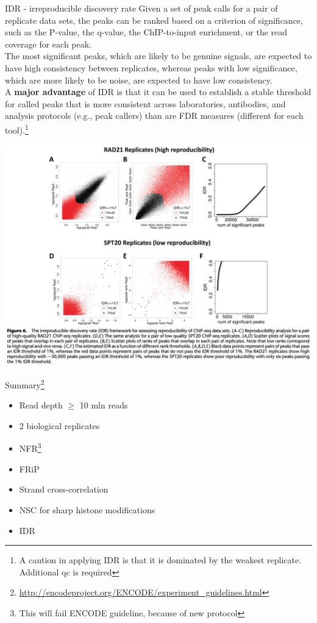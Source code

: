 \documentclass{beamer}
\begin{document}
\begin{frame}{IDR - irreproducible discovery rate}
Given a set of peak calls for a pair of replicate data sets, the peaks can be ranked based on a criterion of significance, such as the P-value, the q-value, the ChIP-to-input enrichment, or the read coverage for each peak.\\
The most significant peaks, which are likely to be genuine signals, are expected to have high consistency between replicates, whereas peaks with low significance, which are more likely to be noise, are expected to have low consistency.\\
A \textbf{major advantage} of IDR is that it can be used to establish a stable threshold for called peaks that is more consistent across laboratories, antibodies, and analysis protocols (e.g., peak callers) than are FDR measures (different for each tool).\footnote{A caution in applying IDR is that it is dominated by the weakest replicate. Additional qc is required}
\end{frame}

\begin{frame}
\includegraphics[width=\linewidth]{idr.png}
\end{frame}


\begin{frame}{Summary\footnote{\url{http://encodeproject.org/ENCODE/experiment_guidelines.html}}}
\begin{itemize}
\item Read depth $\geq$ 10 mln reads
\item 2 biological replicates
\item NFR\footnote{This will fail ENCODE guideline, because of new protocol}
\item FRiP
\item Strand cross-correlation
\item NSC for sharp histone modifications 
\item IDR
\end{itemize}
\end{frame}
\end{document}
